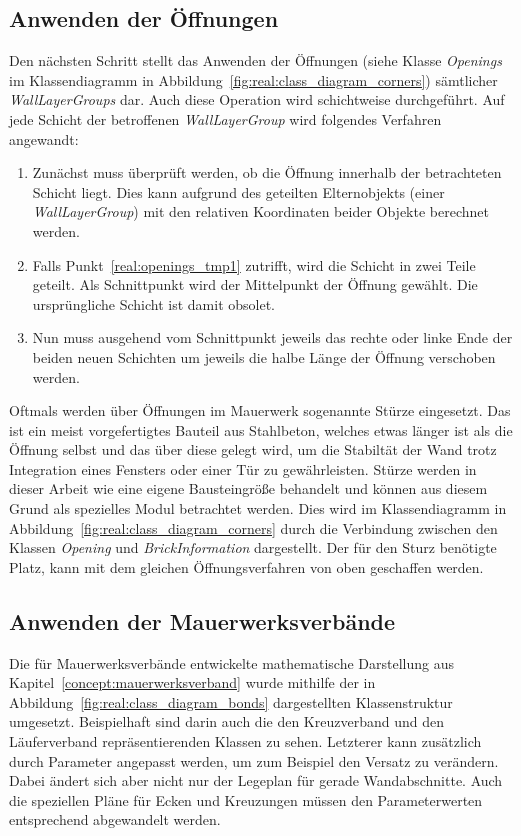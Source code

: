 \subsection{Anwenden der Öffnungen}
Den nächsten Schritt stellt das Anwenden der Öffnungen (siehe Klasse \textit{Openings} im Klassendiagramm in Abbildung~\ref{fig:real:class_diagram_corners}) sämtlicher \textit{WallLayerGroups} dar.
Auch diese Operation wird schichtweise durchgeführt.
Auf jede Schicht der betroffenen \textit{WallLayerGroup} wird folgendes Verfahren angewandt:
\begin{enumerate}
  \item\label{real:openings_tmp1} Zunächst muss überprüft werden, ob die Öffnung innerhalb der betrachteten Schicht liegt. Dies kann aufgrund des geteilten Elternobjekts (einer \textit{WallLayerGroup}) mit den relativen Koordinaten beider Objekte berechnet werden. 
  \item Falls Punkt~\ref{real:openings_tmp1} zutrifft, wird die Schicht in zwei Teile geteilt. Als Schnittpunkt wird der Mittelpunkt der Öffnung gewählt. Die ursprüngliche Schicht ist damit obsolet.
  \item Nun muss ausgehend vom Schnittpunkt jeweils das rechte oder linke Ende der beiden neuen Schichten um jeweils die halbe Länge der Öffnung verschoben werden.
\end{enumerate}
Oftmals werden über Öffnungen im Mauerwerk sogenannte Stürze eingesetzt.
Das ist ein meist vorgefertigtes Bauteil aus Stahlbeton, welches etwas länger ist als die Öffnung selbst und das über diese gelegt wird, um die Stabiltät der Wand trotz Integration eines Fensters oder einer Tür zu gewährleisten.
Stürze werden in dieser Arbeit wie eine eigene Bausteingröße behandelt und können aus diesem Grund als spezielles Modul betrachtet werden.
Dies wird im Klassendiagramm in Abbildung~\ref{fig:real:class_diagram_corners} durch die Verbindung zwischen den Klassen \textit{Opening} und \textit{BrickInformation} dargestellt.
Der für den Sturz benötigte Platz, kann mit dem gleichen Öffnungsverfahren von oben geschaffen werden.

\subsection{Anwenden der Mauerwerksverbände}
Die für Mauerwerksverbände entwickelte mathematische Darstellung aus Kapitel~\ref{concept:mauerwerksverband} wurde mithilfe der in Abbildung~\ref{fig:real:class_diagram_bonds} dargestellten Klassenstruktur umgesetzt.
Beispielhaft sind darin auch die den Kreuzverband und den Läuferverband repräsentierenden Klassen zu sehen.
Letzterer kann zusätzlich durch Parameter angepasst werden, um zum Beispiel den Versatz zu verändern.
Dabei ändert sich aber nicht nur der Legeplan für gerade Wandabschnitte.
Auch die speziellen Pläne für Ecken und Kreuzungen müssen den Parameterwerten entsprechend abgewandelt werden.

